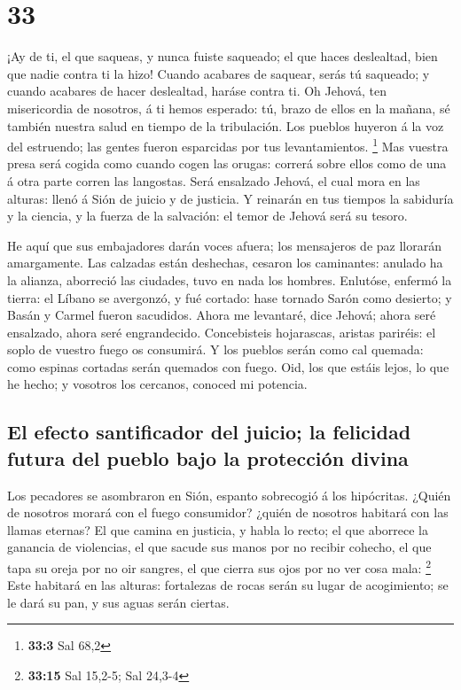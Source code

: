\hypertarget{section-32}{%
\section{33}\label{section-32}}

 ¡Ay de ti, el que saqueas, y nunca fuiste saqueado; el que
haces deslealtad, bien que nadie contra ti la hizo! Cuando acabares de
saquear, serás tú saqueado; y cuando acabares de hacer deslealtad,
haráse contra ti.  Oh Jehová, ten misericordia de nosotros,
á ti hemos esperado: tú, brazo de ellos en la mañana, sé también nuestra
salud en tiempo de la tribulación.  Los pueblos huyeron á la
voz del estruendo; las gentes fueron esparcidas por tus levantamientos.
\footnote{\textbf{33:3} Sal 68,2}  Mas vuestra presa será
cogida como cuando cogen las orugas: correrá sobre ellos como de una á
otra parte corren las langostas.  Será ensalzado Jehová, el
cual mora en las alturas: llenó á Sión de juicio y de justicia.
 Y reinarán en tus tiempos la sabiduría y la ciencia, y la
fuerza de la salvación: el temor de Jehová será su tesoro.

 He aquí que sus embajadores darán voces afuera; los
mensajeros de paz llorarán amargamente.  Las calzadas están
deshechas, cesaron los caminantes: anulado ha la alianza, aborreció las
ciudades, tuvo en nada los hombres.  Enlutóse, enfermó la
tierra: el Líbano se avergonzó, y fué cortado: hase tornado Sarón como
desierto; y Basán y Carmel fueron sacudidos.  Ahora me
levantaré, dice Jehová; ahora seré ensalzado, ahora seré engrandecido.
 Concebisteis hojarascas, aristas pariréis: el soplo de
vuestro fuego os consumirá.  Y los pueblos serán como cal
quemada: como espinas cortadas serán quemados con fuego. 
Oid, los que estáis lejos, lo que he hecho; y vosotros los cercanos,
conoced mi potencia.

\hypertarget{el-efecto-santificador-del-juicio-la-felicidad-futura-del-pueblo-bajo-la-protecciuxf3n-divina}{%
\subsection{El efecto santificador del juicio; la felicidad futura del
pueblo bajo la protección
divina}\label{el-efecto-santificador-del-juicio-la-felicidad-futura-del-pueblo-bajo-la-protecciuxf3n-divina}}

 Los pecadores se asombraron en Sión, espanto sobrecogió á
los hipócritas. ¿Quién de nosotros morará con el fuego consumidor?
¿quién de nosotros habitará con las llamas eternas?  El que
camina en justicia, y habla lo recto; el que aborrece la ganancia de
violencias, el que sacude sus manos por no recibir cohecho, el que tapa
su oreja por no oir sangres, el que cierra sus ojos por no ver cosa
mala: \footnote{\textbf{33:15} Sal 15,2-5; Sal 24,3-4} 
Este habitará en las alturas: fortalezas de rocas serán su lugar de
acogimiento; se le dará su pan, y sus aguas serán ciertas.

